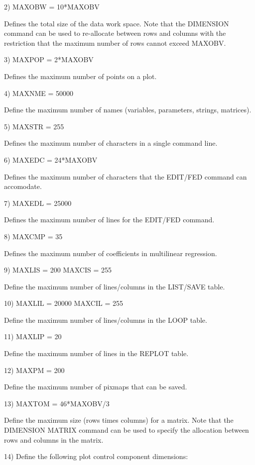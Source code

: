  2) MAXOBW   = 10*MAXOBV

     Defines the total size of the data work space.  Note that
     the DIMENSION command can be used to re-allocate between
     rows and columns with the restriction that the maximum
     number of rows cannot exceed MAXOBV.

  3) MAXPOP   = 2*MAXOBV

     Defines the maximum number of points on a plot.
  
  4) MAXNME   = 50000

     Define the maximum number of names (variables, parameters,
     strings, matrices).

  5) MAXSTR   = 255

     Defines the maximum number of characters in a single command
     line.

  6) MAXEDC   = 24*MAXOBV

     Defines the maximum number of characters that the EDIT/FED
     command can accomodate.

  7) MAXEDL   = 25000

     Defines the maximum number of lines for the EDIT/FED command.

  8) MAXCMP   = 35

     Defines the maximum number of coefficients in multilinear
     regression.

  9) MAXLIS   = 200
     MAXCIS   = 255

     Define the maximum number of lines/columns in the LIST/SAVE
     table.

 10) MAXLIL   = 20000
     MAXCIL   = 255

     Define the maximum number of lines/columns in the LOOP table.

 11) MAXLIP   = 20

     Define the maximum number of lines in the REPLOT table.

 12) MAXPM    = 200

     Define the maximum number of pixmaps that can be saved.

 13) MAXTOM   = 46*MAXOBV/3

     Define the maximum size (rows times columns) for a matrix.
     Note that the DIMENSION MATRIX command can be used to
     specify the allocation between rows and columns in the matrix.

 14) Define the following plot control component dimensions:

